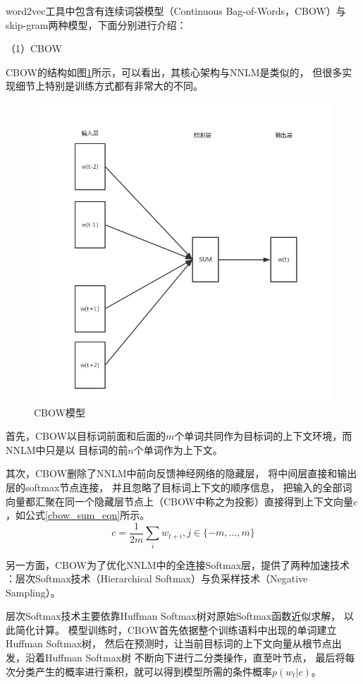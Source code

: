 \documentclass{standalone}
\begin{document}
word2vec工具中包含有连续词袋模型（Continuous Bag-of-Words，CBOW）与
skip-gram两种模型，下面分别进行介绍：

（1）CBOW

CBOW的结构如图\ref{cbow}所示，可以看出，其核心架构与NNLM是类似的，
但很多实现细节上特别是训练方式都有非常大的不同。
\begin{figure}[h]
    \includegraphics[scale=0.6]{picture/cbow.png}
    \caption{CBOW模型}
    \label{cbow}
\end{figure}

首先，CBOW以目标词前面和后面的$m$个单词共同作为目标词的上下文环境，而NNLM中只是以
目标词的前$n$个单词作为上下文。

其次，CBOW删除了NNLM中前向反馈神经网络的隐藏层，
将中间层直接和输出层的softmax节点连接，
并且忽略了目标词上下文的顺序信息，
把输入的全部词向量都汇聚在同一个隐藏层节点上（CBOW中称之为投影）直接得到上下文向量$c$
，如公式\ref{cbow_sum_eqn}所示。
\begin{equation}
    c = \frac{1}{2m}\sum_i w_{t+i}, j\in \{-m,...,m\}
    \label{cbow_sum_eqn}
\end{equation}

另一方面，CBOW为了优化NNLM中的全连接Softmax层，提供了两种加速技术
：层次Softmax技术（Hierarchical Softmax）与负采样技术（Negative Sampling）。

层次Softmax技术主要依靠Huffman Softmax树对原始Softmax函数近似求解，
以此简化计算。
模型训练时，CBOW首先依据整个训练语料中出现的单词建立Huffman Softmax树，
然后在预测时，让当前目标词的上下文向量从根节点出发，沿着Huffman Softmax树
不断向下进行二分类操作，直至叶节点，
最后将每次分类产生的概率进行乘积，就可以得到模型所需的条件概率$p(w_t|c)$。
\end{document}

